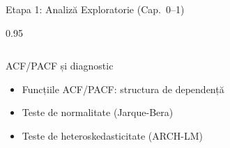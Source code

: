 \documentclass[9pt, aspectratio=169, t]{beamer}
\begin{document}
\begin{frame}{Etapa 1: Analiză Exploratorie (Cap.\ 0--1)}
\begin{cminipage}{0.95\textwidth}
{\begin{columns}[T]
            \vspace{0.15cm}

            \begin{block}{ACF/PACF și diagnostic}
                \begin{itemize}\setlength{\itemsep}{0pt}
                    \item Funcțiile ACF/PACF: structura de dependență
                    \item Teste de normalitate (Jarque-Bera)
                    \item Teste de heteroskedasticitate (ARCH-LM)
                \end{itemize}
            \end{block}
        \end{columns}
        }
    \end{cminipage}
\end{frame}
\end{document}
